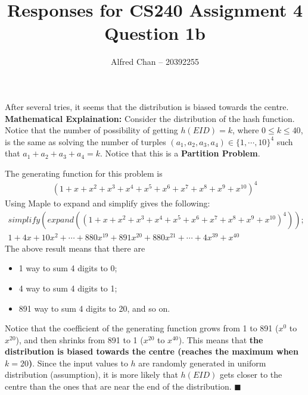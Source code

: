 \documentclass[12pt]{article}
\title{Responses for CS240 Assignment 4 Question 1b}
\author{Alfred Chan -- 20392255}
\begin{document}
\maketitle
After several tries, it seems that the distribution is biased towards the centre.\\

{\bf Mathematical Explaination:} Consider the distribution of the hash function.
Notice that the number of possibility of getting $h(EID) = k$,
where $0 \le k \le 40$, is the same as solving the number of turples 
	$(a_1,a_2,a_3,a_4) \in \{1, \cdots, 10\}^4$ such that $a_1 + a_2 + a_3 + a_4 = k$.
Notice that this is a {\bf Partition Problem}.

The generating function for this problem is
\begin{align}
(1+x+x^2+x^3+x^4+x^5+x^6+x^7+x^8+x^9+x^{10})^4
\end{align}
Using Maple to expand and simplify gives the following:
\begin{gather*}
simplify(expand((1+x+x^2+x^3+x^4+x^5+x^6+x^7+x^8+x^9+x^10)^4));\\
1+4x+10x^2+ \cdots
	+ 880x^{19} + 891x^{20} + 880x^{21} + \cdots
	+ 4x^{39} + x^{40}
\end{gather*}
The above result means that there are
\begin{itemize}
\item 1 way to sum 4 digits to 0;
\item 4 way to sum 4 digits to 1;
\item 891 way to sum 4 digits to 20, and so on.
\end{itemize}

Notice that the coefficient of the generating function
	grows from 1 to 891 ($x^{0}$ to $x^{20}$),
	and then shrinks from 891 to 1 ($x^{20}$ to $x^{40}$).
This means that {\bf the distribution is biased towards the centre (reaches the maximum when $k=20$)}.
Since the input values to $h$ are randomly generated in uniform distribution (assumption),
it is more likely that $h(EID)$ gets closer to the centre than the ones that are near the end of the distribution.
\hfill $\blacksquare$
\end{document}
